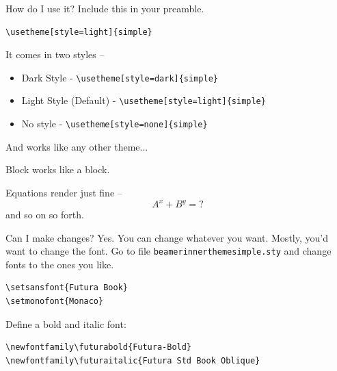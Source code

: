 \documentclass[xetex, aspectratio=169]{beamer}
\begin{document}
\begin{frame}[fragile]{How do I use it?}
	Include this in your preamble.
\begin{verbatim}
\usetheme[style=light]{simple} 
\end{verbatim}

It comes in	two styles --
\begin{itemize}
	\item Dark Style - \verb|\usetheme[style=dark]{simple} |
	\item \alert{Light Style (Default)}  - \verb|\usetheme[style=light]{simple} |
	\item No style - \verb|\usetheme[style=none]{simple} |
\end{itemize}

And works like any other theme...

\begin{block}{Block}
works like a block.
\end{block}

Equations render just fine -- 
\begin{equation}
A^x + B^y = ?
\end{equation}
and so on so forth.
\end{frame}

\begin{frame}[fragile]{Can I make changes?}
Yes. You can change whatever you want. Mostly, you'd want to change the font. Go to file \verb|beamerinnerthemesimple.sty| and change fonts to the ones you like.
\begin{verbatim}
\setsansfont{Futura Book}
\setmonofont{Monaco}
\end{verbatim}
Define a bold and italic font:
\begin{verbatim}
\newfontfamily\futurabold{Futura-Bold}
\newfontfamily\futuraitalic{Futura Std Book Oblique}
\end{verbatim}
\end{frame}

\begin{frame}
	\vspace{2\baselineskip}
\end{frame}
\end{document}
